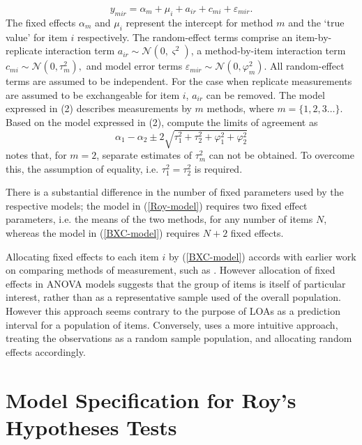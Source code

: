 \documentclass[12pt, a4paper]{report}
\theoremstyle{plain}
\theoremstyle{definition}
\theoremstyle{remark}
\begin{document}
	\begin{equation}\label{BXC-model}
	y_{mir}  = \alpha_{m} + \mu_{i} + a_{ir} + c_{mi} + \varepsilon_{mir}.
	\end{equation}
	The fixed effects $\alpha_{m}$ and $\mu_{i}$ represent the intercept for method $m$ and the `true value' for item $i$ respectively. The random-effect terms comprise an item-by-replicate interaction term $a_{ir} \sim \mathcal{N}(0,\varsigma^{2})$, a method-by-item interaction term $c_{mi} \sim \mathcal{N}(0,\tau^{2}_{m}),$ and model error terms $\varepsilon_{mir} \sim \mathcal{N}(0,\varphi^{2}_{m}).$ All random-effect terms are assumed to be independent. For the case when replicate measurements are assumed to be exchangeable for item $i$, $a_{ir}$ can be removed. The model expressed in (2) describes measurements by $m$ methods, where $m = \{1,2,3\ldots\}$. Based on the model expressed in (2), \citet{BXC2008} compute the limits of agreement as
	\[
	\alpha_1 - \alpha_2 \pm 2 \sqrt{ \tau^2_1 +  \tau^2_2 +  \varphi^2_1 +  \varphi^2_2 }
	\]
	\citet{BXC2008} notes that, for $m=2$,  separate estimates of $\tau^2_m$ can not be obtained. To overcome this, the assumption of equality, i.e. $\tau^2_1 = \tau^2_2$ is required.
	
	There is a substantial difference in the number of fixed parameters used by the respective models; the model in (\ref{Roy-model}) requires two fixed effect parameters, i.e. the means of the two methods, for any number of items $N$, whereas the model in (\ref{BXC-model}) requires $N+2$ fixed effects.
	
	Allocating fixed effects to each item $i$ by (\ref{BXC-model}) accords with earlier work on comparing methods of measurement, such as \citet{Grubbs48}. However allocation of fixed effects in ANOVA models suggests that the group of items is itself of particular interest, rather than as a representative sample used of the overall population. However this approach seems contrary to the purpose of LOAs as a prediction interval for a population of items. Conversely, \citet{roy}
	uses a more intuitive approach, treating the observations as a random sample population, and allocating random effects accordingly.
	
	\newpage
	




\newpage


		\section{Model Specification for Roy's Hypotheses Tests}
		
\end{document}
